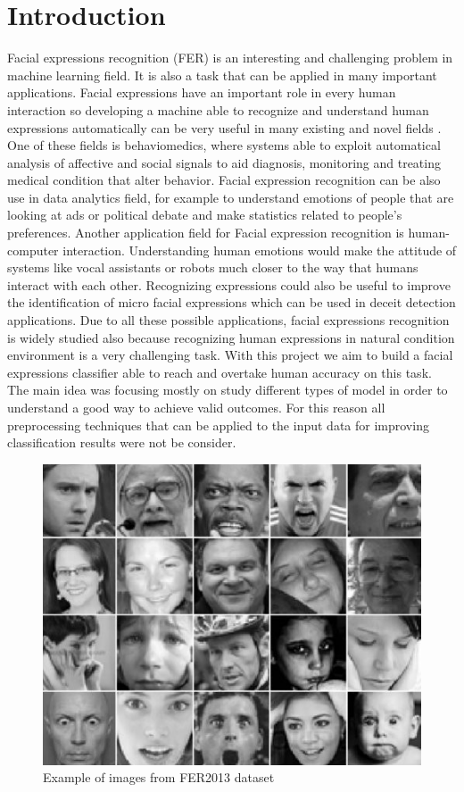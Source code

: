 \documentclass[10pt,twocolumn,letterpaper]{article}
\begin{document}
\section{Introduction}
Facial expressions recognition (FER) is an interesting and challenging problem in machine learning field. It is also a task that can be applied in many important applications. Facial expressions have an important role in every human interaction so developing a machine able to recognize and understand human expressions automatically can be very useful in many existing and novel fields \cite{2}. \\
One of these fields is behaviomedics, where systems able to exploit automatical analysis of affective and social signals to aid diagnosis, monitoring and treating medical condition that alter behavior. Facial expression recognition can be also use in data analytics field, for example to understand emotions of people that are looking at ads or political debate and make statistics related to people's preferences. Another application field for Facial expression recognition is human-computer interaction. Understanding human emotions would make the attitude of systems like vocal assistants or robots much closer to the way that humans interact with each other. Recognizing expressions could also be useful to improve the identification of micro facial expressions which can be used in deceit detection applications. Due to all these possible applications, facial expressions recognition is widely studied also because recognizing human expressions in natural condition environment is a very challenging task. With this project we aim to build a facial expressions classifier able to reach and overtake human accuracy on this task. The main idea was focusing mostly on study different types of model in order to understand a good way to achieve valid outcomes. For this reason all preprocessing techniques that can be applied to the input data for improving classification results were not be consider.
\begin{figure}[H]
   \centering
   \includegraphics[width=0.8\linewidth]{./immagini/dataset.jpeg}
   \caption{Example of images from FER2013 dataset}
\end{figure}
\end{document}
